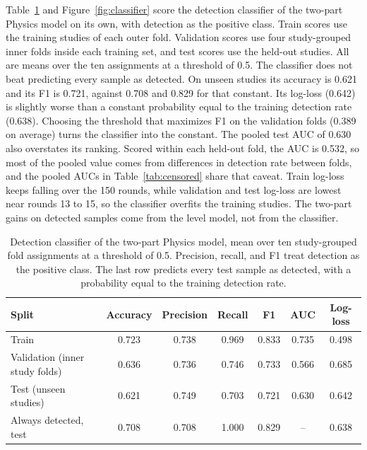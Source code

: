 \documentclass[12pt,a4paper]{report}
\begin{document}
Table~\ref{tab:classifier} and Figure~\ref{fig:classifier} score the detection classifier of the two-part Physics model on its own, with detection as the positive class. Train scores use the training studies of each outer fold. Validation scores use four study-grouped inner folds inside each training set, and test scores use the held-out studies. All are means over the ten assignments at a threshold of 0.5. The classifier does not beat predicting every sample as detected. On unseen studies its accuracy is 0.621 and its F1 is 0.721, against 0.708 and 0.829 for that constant. Its log-loss (0.642) is slightly worse than a constant probability equal to the training detection rate (0.638). Choosing the threshold that maximizes F1 on the validation folds (0.389 on average) turns the classifier into the constant. The pooled test AUC of 0.630 also overstates its ranking. Scored within each held-out fold, the AUC is 0.532, so most of the pooled value comes from differences in detection rate between folds, and the pooled AUCs in Table~\ref{tab:censored} share that caveat. Train log-loss keeps falling over the 150 rounds, while validation and test log-loss are lowest near rounds 13 to 15, so the classifier overfits the training studies. The two-part gains on detected samples come from the level model, not from the classifier.

\begin{table}[!htbp]
\centering
\caption[Detection classifier of the two-part Physics model]{Detection classifier of the two-part Physics model, mean over ten study-grouped fold assignments at a threshold of 0.5. Precision, recall, and F1 treat detection as the positive class. The last row predicts every test sample as detected, with a probability equal to the training detection rate.}
\label{tab:classifier}
\small
\begin{tabular}{@{}lcccccc@{}}
\toprule
Split & Accuracy & Precision & Recall & F1 & AUC & Log-loss\\
\midrule
Train & 0.723 & 0.738 & 0.969 & 0.833 & 0.735 & 0.498\\
Validation (inner study folds) & 0.636 & 0.736 & 0.746 & 0.733 & 0.566 & 0.685\\
Test (unseen studies) & 0.621 & 0.749 & 0.703 & 0.721 & 0.630 & 0.642\\
\midrule
Always detected, test & 0.708 & 0.708 & 1.000 & 0.829 & -- & 0.638\\
\bottomrule
\end{tabular}
\end{table}
\end{document}
